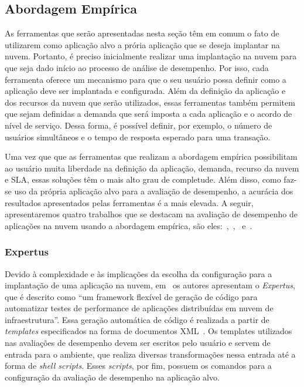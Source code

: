 \subsection{Abordagem Empírica}
As ferramentas que serão apresentadas nesta seção têm em comum o fato de utilizarem como aplicação alvo a prória aplicação que se deseja implantar na nuvem. Portanto, é preciso inicialmente realizar uma implantação na nuvem para que seja dado início ao processo de análise de desempenho. Por isso, cada ferramenta oferece um mecanismo para que o seu usuário possa definir como a aplicação deve ser implantada e configurada. Além da definição da aplicação e dos recursos da nuvem que serão utilizados, essas ferramentas também permitem que sejam definidas a demanda que será imposta a cada aplicação e o acordo de nível de serviço. Dessa forma, é possível definir, por exemplo, o número de usuários simultâneos e o tempo de resposta esperado para uma transação.

Uma vez que que as ferramentas que realizam a abordagem empírica possibilitam ao usuário muita liberdade na definição da aplicação, demanda, recurso da nuvem e SLA, essas soluções têm o mais alto grau de completude. Além disso, como faz-se uso da própria aplicação alvo para a avaliação de desempenho, a acurácia dos resultados apresentados pelas ferramentas é a mais elevada. A seguir, apresentaremos quatro trabalhos que se destacam na avaliação de desempenho de aplicações na nuvem usando a abordagem empírica, são eles:~\cite{jayasinghe2012},~\cite{silva2013cloudbench},~\cite{cunhacloud} e~\cite{scheuner2014cloud}.

\subsubsection{Expertus}
Devido à complexidade e às implicações da escolha da configuração para a implantação de uma aplicação na nuvem, em~\cite{jayasinghe2012} os autores apresentam o \textit{Expertus}, que é descrito como ``um framework flexível de geração de código para automatizar testes de performance de aplicações distribuídas em nuvem de infraestrutura''. Essa geração automática de código é realizada a partir de {\em templates} especificados na forma de documentos XML~\cite{jayasinghe2012}. Os templates utilizados nas avaliações de desempenho devem ser escritos pelo usuário e servem de entrada para o ambiente, que realiza diversas transformações nessa entrada até a forma de \textit{shell scripts}. Esses \textit{scripts}, por fim, possuem os comandos para a configuração da avaliação de desempenho na aplicação alvo.

